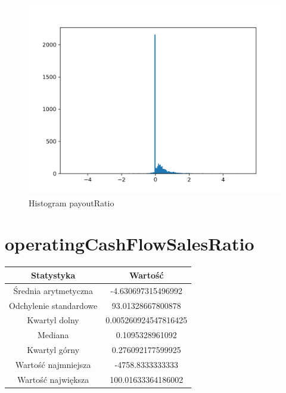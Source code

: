 \documentclass{article}
\begin{document}
\begin{figure}[h!]
    \includegraphics[width=\linewidth]{variables/payoutRatio.png}
    \caption{Histogram payoutRatio }
\end{figure}\section{ operatingCashFlowSalesRatio }

\begin{center}
    \begin{tabular}{|c | c|} 
    \hline
    Statystyka & Wartość \\
    \hline\hline
    Średnia arytmetyczna & -4.630697315496992 \\ 
    \hline
    Odchylenie standardowe & 93.01328667800878 \\
    \hline
    Kwartyl dolny & 0.005260924547816425 \\
    \hline
    Mediana & 0.1095328961092 \\
    \hline
    Kwartyl górny & 0.276092177599925 \\
    \hline
    Wartość najmniejsza & -4758.8333333333 \\
    \hline
    Wartość największa & 100.01633364186002 \\
    \hline
   \end{tabular}
\end{center}
\end{document}
